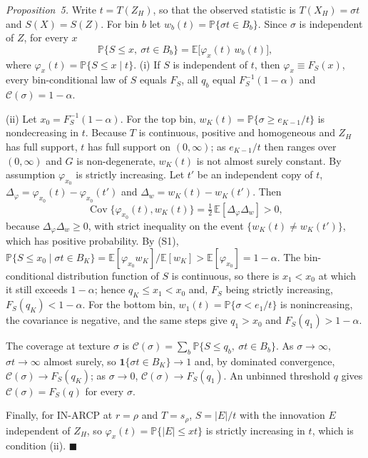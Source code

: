 \documentclass[10pt]{article}
\begin{document}
\emph{Proposition~5.}
Write $t=T(Z_H)$, so that the observed statistic is $T(X_H)=\sigma t$ and $S(X)=S(Z)$. For bin $b$ let $w_b(t)=\mathbb{P}\{\sigma t\in B_b\}$. Since $\sigma$ is independent of $Z$, for every $x$
\begin{equation}
\mathbb{P}\{S\le x,\ \sigma t\in B_b\}=\mathbb E\big[\varphi_x(t)\,w_b(t)\big],
\tag{S1}
\end{equation}
where $\varphi_x(t)=\mathbb{P}\{S\le x\mid t\}$.
(i) If $S$ is independent of $t$, then $\varphi_x\equiv F_S(x)$, every bin-conditional law of $S$ equals $F_S$, all $q_b$ equal $F_S^{-1}(1-\alpha)$ and $\mathcal C(\sigma)=1-\alpha$.

(ii) Let $x_0=F_S^{-1}(1-\alpha)$. For the top bin, $w_K(t)=\mathbb{P}\{\sigma\ge e_{K-1}/t\}$ is nondecreasing in $t$. Because $T$ is continuous, positive and homogeneous and $Z_H$ has full support, $t$ has full support on $(0,\infty)$; as $e_{K-1}/t$ then ranges over $(0,\infty)$ and $G$ is non-degenerate, $w_K(t)$ is not almost surely constant. By assumption $\varphi_{x_0}$ is strictly increasing. Let $t'$ be an independent copy of $t$, $\Delta_\varphi=\varphi_{x_0}(t)-\varphi_{x_0}(t')$ and $\Delta_w=w_K(t)-w_K(t')$. Then
\[
\operatorname{Cov}\{\varphi_{x_0}(t),w_K(t)\}=\tfrac12\,\mathbb E[\Delta_\varphi\Delta_w]>0,
\]
because $\Delta_\varphi\Delta_w\ge0$, with strict inequality on the event $\{w_K(t)\ne w_K(t')\}$, which has positive probability. By (S1),
$\mathbb{P}\{S\le x_0\mid\sigma t\in B_K\}=\mathbb E[\varphi_{x_0}w_K]/\mathbb E[w_K]>\mathbb E[\varphi_{x_0}]=1-\alpha$.
The bin-conditional distribution function of $S$ is continuous, so there is $x_1<x_0$ at which it still exceeds $1-\alpha$; hence $q_K\le x_1<x_0$ and, $F_S$ being strictly increasing, $F_S(q_K)<1-\alpha$. For the bottom bin, $w_1(t)=\mathbb{P}\{\sigma<e_1/t\}$ is nonincreasing, the covariance is negative, and the same steps give $q_1>x_0$ and $F_S(q_1)>1-\alpha$.

The coverage at texture $\sigma$ is $\mathcal C(\sigma)=\sum_b\mathbb{P}\{S\le q_b,\ \sigma t\in B_b\}$. As $\sigma\to\infty$, $\sigma t\to\infty$ almost surely, so $\mathbf 1\{\sigma t\in B_K\}\to1$ and, by dominated convergence, $\mathcal C(\sigma)\to F_S(q_K)$; as $\sigma\to0$, $\mathcal C(\sigma)\to F_S(q_1)$. An unbinned threshold $q$ gives $\mathcal C(\sigma)=F_S(q)$ for every $\sigma$.

Finally, for IN-ARCP at $r=\rho$ and $T=s_\rho$, $S=|E|/t$ with the innovation $E$ independent of $Z_H$, so $\varphi_x(t)=\mathbb{P}\{|E|\le xt\}$ is strictly increasing in $t$, which is condition (ii). \hfill$\blacksquare$
\end{document}
